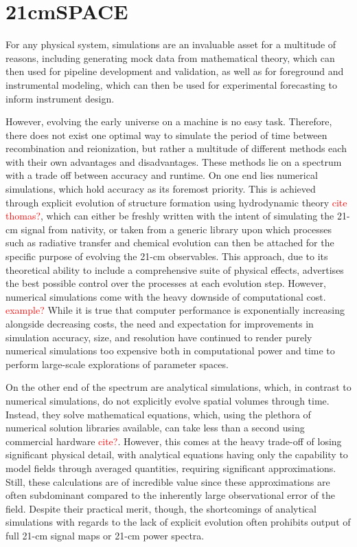 \documentclass[floats,floatfix,showpacs,amssymb,prd,superscriptaddress,nofootinbib]{revtex4-2} %
\newcommand{\red}{\textcolor{red}}
\begin{document}
\section{21cmSPACE}
For any physical system, simulations are an invaluable asset for a multitude of reasons, including generating mock data from mathematical theory, which can then used for pipeline development and validation, as well as for foreground and instrumental modeling, which can then be used for experimental forecasting to inform instrument design. 

However, evolving the early universe on a machine is no easy task. Therefore, there does not exist one optimal way to simulate the period of time between recombination and reionization, but rather a multitude of different methods each with their own advantages and disadvantages. These methods lie on a spectrum with a trade off between accuracy and runtime. On one end lies numerical simulations, which hold accuracy as its foremost priority. This is achieved through explicit evolution of structure formation using hydrodynamic theory \red{cite thomas?}, which can either be freshly written with the intent of simulating the 21-cm signal from nativity, or taken from a generic library upon which processes such as radiative transfer and chemical evolution can then be attached for the specific purpose of evolving the 21-cm observables. This approach, due to its theoretical ability to include a comprehensive suite of physical effects, advertises the best possible control over the processes at each evolution step. However, numerical simulations come with the heavy downside of computational cost. \red{example?} While it is true that computer performance is exponentially increasing alongside decreasing costs, the need and expectation for improvements in simulation accuracy, size, and resolution have continued to render purely numerical simulations too expensive both in computational power and time to perform large-scale explorations of parameter spaces.

On the other end of the spectrum are analytical simulations, which, in contrast to numerical simulations, do not explicitly evolve spatial volumes through time. Instead, they solve mathematical equations, which, using the plethora of numerical solution libraries available, can take less than a second using commercial hardware \red{cite?}. However, this comes at the heavy trade-off of losing significant physical detail, with analytical equations having only the capability to model fields through averaged quantities, requiring significant approximations. Still, these calculations are of incredible value since these approximations are often subdominant compared to the inherently large observational error of the field. Despite their practical merit, though, the shortcomings of analytical simulations with regards to the lack of explicit evolution often prohibits output of full 21-cm signal maps or 21-cm power spectra.
\end{document}
